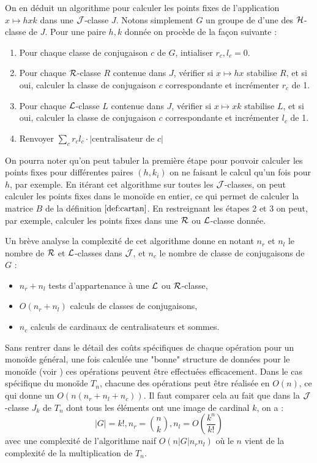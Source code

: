 \documentclass{article}
\begin{document}
	On en déduit un algorithme pour calculer les points fixes de l'application $x \mapsto hxk$ dans une $\mathcal{J}$-classe $J$. Notons simplement $G$ un groupe de \schu d'une des $\mathcal{H}$-classe de $J$. Pour une paire $h, k$ donnée on procède de la façon suivante :
	\begin{enumerate}
		\item Pour chaque classe de conjugaison $c$ de $G$, intialiser $r_c, l_c = 0$.
		\item Pour chaque $\mathcal{R}$-classe $R$ contenue dans $J$, vérifier si $x \mapsto hx$ stabilise $R$, et si oui, calculer la classe de conjugaison $c$ correspondante et incrémenter $r_c$ de 1.
		\item Pour chaque $\mathcal{L}$-classe $L$ contenue dans $J$, vérifier si $x \mapsto xk$ stabilise $L$, et si oui, calculer la classe de conjugaison $c$ correspondante et incrémenter $l_c$ de 1.
		\item Renvoyer $\sum_c r_cl_c\cdot |\textrm{centralisateur de }c|$
	\end{enumerate} 

	On pourra noter qu'on peut tabuler la première étape pour pouvoir calculer les points fixes pour différentes paires $(h, k_i)$ on ne faisant le calcul qu'un fois pour $h$, par exemple. En itérant cet algorithme sur toutes les $\mathcal{J}$-classes, on peut calculer les points fixes dans le monoïde en entier, ce qui permet de calculer la matrice $B$ de la définition $\ref{def:cartan}$. En restreignant les étapes 2 et 3 on peut, par exemple, calculer les points fixes dans une $\mathcal{R}$ ou $\mathcal{L}$-classe donnée.
	
	Un brève analyse la complexité de cet algorithme donne en notant $n_r$ et $n_l$ le nombre de $\mathcal{R}$ et $\mathcal{L}$-classes dans $\mathcal{J}$, et $n_c$ le nombre de classe de conjugaisons de $G$ :
	\begin{itemize}
		\item $n_r + n_l$ tests d'appartenance à une $\mathcal{L}$ ou $\mathcal{R}$-classe,
		\item $O(n_r + n_l)$ calculs de classes de conjugaisons,
		\item $n_c$ calculs de cardinaux de centralisateurs et sommes.
	\end{itemize}
	Sans rentrer dans le détail des coûts spécifiques de chaque opération pour un monoïde général, une fois calculée une "bonne" structure de données pour le monoïde (voir \cite{east2019computing}) ces opérations peuvent être effectuées efficacement. Dans le cas spécifique du monoïde $T_n$, chacune des opérations peut être réalisée en $O(n)$, ce qui donne un $O(n(n_r+n_l+n_c))$.
	Il faut comparer cela au fait que dans la $\mathcal{J}$-classe $J_k$ de $T_n$ dont tous les éléments ont une image de cardinal $k$, on a :
	\[|G| = k!, n_r = {n \choose k}, n_l = O\left(\frac{k^n}{k!}\right)\]
	avec une complexité de l'algorithme naif $O(n|G|n_rn_l)$ où le $n$ vient de la complexité de la multiplication de $T_n$.
	
\end{document}
